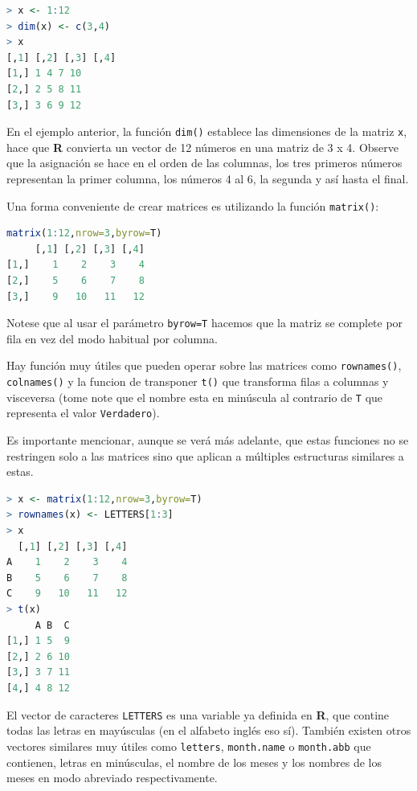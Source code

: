 \begin{lstlisting}[language=R]
> x <- 1:12
> dim(x) <- c(3,4)
> x
[,1] [,2] [,3] [,4]
[1,] 1 4 7 10
[2,] 2 5 8 11
[3,] 3 6 9 12
\end{lstlisting}

En el ejemplo anterior, la función \texttt{dim()} establece las dimensiones de
la matriz \texttt{x}, hace que \textbf{R} convierta un vector de 12 números en
una matriz de 3 x 4. Observe que la asignación se hace en el orden de las
columnas, los tres primeros números representan la primer columna, los números
4 al 6, la segunda y así hasta el final.

Una forma conveniente de crear matrices es utilizando la función \texttt{matrix()}:

\begin{lstlisting}[language=R]
matrix(1:12,nrow=3,byrow=T)
     [,1] [,2] [,3] [,4]
[1,]    1    2    3    4
[2,]    5    6    7    8
[3,]    9   10   11   12
\end{lstlisting}

Notese que al usar el parámetro \texttt{byrow=T} hacemos que la matriz se
complete por fila en vez del modo habitual por columna.

Hay función muy útiles que pueden operar sobre las matrices como
\texttt{rownames()}, \texttt{colnames()} y la funcion de transponer
\texttt{t()} que transforma filas a columnas y visceversa (tome note que el
nombre esta en minúscula al contrario de \texttt{T} que representa el valor
\texttt{Verdadero}).

\begin{tradnote} Es importante mencionar, aunque se verá más adelante, que
estas funciones no se restringen solo a las matrices sino que aplican a
múltiples estructuras similares a estas.\end{tradnote}

\begin{lstlisting}[language=R]
> x <- matrix(1:12,nrow=3,byrow=T)
> rownames(x) <- LETTERS[1:3]
> x
  [,1] [,2] [,3] [,4]
A    1    2    3    4
B    5    6    7    8
C    9   10   11   12
> t(x)
     A B  C
[1,] 1 5  9
[2,] 2 6 10
[3,] 3 7 11
[4,] 4 8 12
\end{lstlisting}

El vector de caracteres \texttt{LETTERS} es una variable ya definida en
\textbf{R}, que contine todas las letras en mayúsculas (en el alfabeto inglés
eso sí). También existen otros vectores similares muy útiles como
\texttt{letters}, \texttt{month.name} o \texttt{month.abb} que contienen,
letras en minúsculas, el nombre de los meses y los nombres de los meses en modo
abreviado respectivamente.

